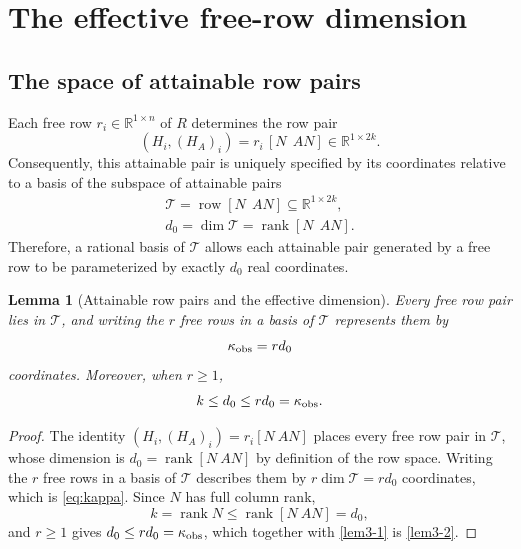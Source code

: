 \documentclass[journal]{IEEEtran}
\theoremstyle{plainn}
\newtheorem{lem}[thm]{Lemma}
\theoremstyle{remark}
\begin{document}
\section{The effective free-row dimension}\label{sec:dimension}

\subsection{The space of attainable row pairs}\label{sec:free}

Each free row $r_i\in\mathbb R^{1\times n}$ of $R$ determines the row pair
\begin{equation*}
(H_i,(H_A)_i)=r_i\,[N\ \ AN] \in\mathbb R^{1\times 2k}.
\end{equation*}
Consequently, this attainable pair is uniquely specified by its coordinates relative to a basis of the subspace of attainable pairs
\begin{equation*}
\begin{gathered}
\mathcal T=\operatorname{row}[N\ \ AN]\subseteq\mathbb R^{1\times 2k},\\
d_0=\dim\mathcal T=\operatorname{rank}[N\ \ AN].
\end{gathered}
\end{equation*}
Therefore, a rational basis of $\mathcal T$ allows each attainable pair generated by a free row to be parameterized by exactly $d_0$ real coordinates.

\begin{lem}[Attainable row pairs and the effective dimension]\label{lem:attainable}
Every free row pair lies in $\mathcal T$, and writing the $r$ free rows in a basis of $\mathcal T$ represents them by
\begin{equation}\label{eq:kappa}
\kappa_{\rm obs}=r d_0
\end{equation}
coordinates. Moreover, when $r\ge1$,
\begin{equation}\label{lem3-2}
k\le d_0\le rd_0=\kappa_{\rm obs}.
\end{equation}
\end{lem}

\begin{proof}
The identity $(H_i,(H_A)_i)=r_i[N\ AN]$ places every free row pair in $\mathcal T$, whose dimension
is $d_0=\operatorname{rank}[N\ AN]$ by definition of the row space. Writing the $r$ free rows in a
basis of $\mathcal T$ describes them by $r\dim\mathcal T=rd_0$ coordinates, which is
\eqref{eq:kappa}. Since $N$ has full column rank,
\begin{equation}\label{lem3-1}
k=\operatorname{rank}N\le\operatorname{rank}[N\ AN]=d_0 ,
\end{equation}
and $r\ge1$ gives $d_0\le rd_0=\kappa_{\rm obs}$, which together with \eqref{lem3-1} is
\eqref{lem3-2}.
\end{proof}
\end{document}
